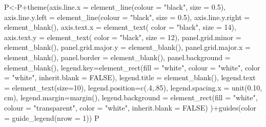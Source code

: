\documentclass[
]{book}
\newenvironment{Shaded}{\begin{snugshade}}{\end{snugshade}}
\newcommand{\AttributeTok}[1]{\textcolor[rgb]{0.77,0.63,0.00}{#1}}
\newcommand{\ConstantTok}[1]{\textcolor[rgb]{0.00,0.00,0.00}{#1}}
\newcommand{\DecValTok}[1]{\textcolor[rgb]{0.00,0.00,0.81}{#1}}
\newcommand{\FloatTok}[1]{\textcolor[rgb]{0.00,0.00,0.81}{#1}}
\newcommand{\FunctionTok}[1]{\textcolor[rgb]{0.00,0.00,0.00}{#1}}
\newcommand{\NormalTok}[1]{#1}
\newcommand{\OtherTok}[1]{\textcolor[rgb]{0.56,0.35,0.01}{#1}}
\newcommand{\SpecialCharTok}[1]{\textcolor[rgb]{0.00,0.00,0.00}{#1}}
\newcommand{\StringTok}[1]{\textcolor[rgb]{0.31,0.60,0.02}{#1}}
\begin{document}
\begin{Shaded}
\begin{Highlighting}[]
\NormalTok{P}\OtherTok{\textless{}{-}}\NormalTok{P}\SpecialCharTok{+}\FunctionTok{theme}\NormalTok{(}\AttributeTok{axis.line.x =} \FunctionTok{element\_line}\NormalTok{(}\AttributeTok{colour =} \StringTok{"black"}\NormalTok{, }\AttributeTok{size =} \FloatTok{0.5}\NormalTok{),}
           \AttributeTok{axis.line.y.left  =} \FunctionTok{element\_line}\NormalTok{(}\AttributeTok{colour =} \StringTok{"black"}\NormalTok{, }\AttributeTok{size =} \FloatTok{0.5}\NormalTok{),}
           \AttributeTok{axis.line.y.right =} \FunctionTok{element\_blank}\NormalTok{(),}
           \AttributeTok{axis.text.x =} \FunctionTok{element\_text}\NormalTok{( }\AttributeTok{color =} \StringTok{"black"}\NormalTok{, }\AttributeTok{size =} \DecValTok{14}\NormalTok{),}
           \AttributeTok{axis.text.y =} \FunctionTok{element\_text}\NormalTok{( }\AttributeTok{color =} \StringTok{"black"}\NormalTok{, }\AttributeTok{size =} \DecValTok{12}\NormalTok{),}
           \AttributeTok{panel.grid.minor =} \FunctionTok{element\_blank}\NormalTok{(),}
           \AttributeTok{panel.grid.major.y =} \FunctionTok{element\_blank}\NormalTok{(),}
           \AttributeTok{panel.grid.major.x =} \FunctionTok{element\_blank}\NormalTok{(),}
           \AttributeTok{panel.border =} \FunctionTok{element\_blank}\NormalTok{(),}
           \AttributeTok{panel.background =} \FunctionTok{element\_blank}\NormalTok{(),}
           \AttributeTok{legend.key=}\FunctionTok{element\_rect}\NormalTok{(}\AttributeTok{fill =} \StringTok{"white"}\NormalTok{, }\AttributeTok{colour =} \StringTok{"white"}\NormalTok{,}
                                   \AttributeTok{color =} \StringTok{"white"}\NormalTok{, }\AttributeTok{inherit.blank =} \ConstantTok{FALSE}\NormalTok{),}
           \AttributeTok{legend.title =} \FunctionTok{element\_blank}\NormalTok{(),}
           \AttributeTok{legend.text  =} \FunctionTok{element\_text}\NormalTok{(}\AttributeTok{size=}\DecValTok{10}\NormalTok{),}
           \AttributeTok{legend.position=}\FunctionTok{c}\NormalTok{(.}\DecValTok{4}\NormalTok{,.}\DecValTok{85}\NormalTok{),}
           \AttributeTok{legend.spacing.x =} \FunctionTok{unit}\NormalTok{(}\FloatTok{0.10}\NormalTok{, }\StringTok{\textquotesingle{}cm\textquotesingle{}}\NormalTok{),}
           \AttributeTok{legend.margin=}\FunctionTok{margin}\NormalTok{(),}
           \AttributeTok{legend.background =} \FunctionTok{element\_rect}\NormalTok{(}\AttributeTok{fill =} \StringTok{"white"}\NormalTok{, }\AttributeTok{colour =} \StringTok{"transparent"}\NormalTok{,}
                                            \AttributeTok{color =} \StringTok{"white"}\NormalTok{, }\AttributeTok{inherit.blank =} \ConstantTok{FALSE}\NormalTok{)}
\NormalTok{)}\SpecialCharTok{+}\FunctionTok{guides}\NormalTok{(}\AttributeTok{color =} \FunctionTok{guide\_legend}\NormalTok{(}\AttributeTok{nrow =} \DecValTok{1}\NormalTok{))}
\NormalTok{P}
\end{Highlighting}
\end{Shaded}
\end{document}

